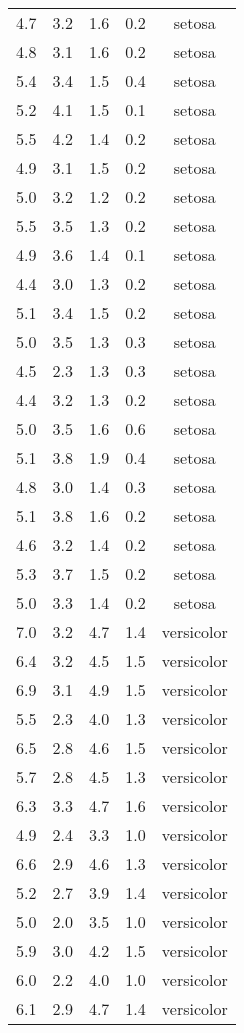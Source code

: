 \documentclass[
  letterpaper,
  DIV=11,
  numbers=noendperiod]{scrartcl}
\begin{document}
\begin{longtable}[]{@{}lrlrc@{}}
4.7 & 3.2 & 1.6 & 0.2 & setosa \\
4.8 & 3.1 & 1.6 & 0.2 & setosa \\
5.4 & 3.4 & 1.5 & 0.4 & setosa \\
5.2 & 4.1 & 1.5 & 0.1 & setosa \\
5.5 & 4.2 & 1.4 & 0.2 & setosa \\
4.9 & 3.1 & 1.5 & 0.2 & setosa \\
5.0 & 3.2 & 1.2 & 0.2 & setosa \\
5.5 & 3.5 & 1.3 & 0.2 & setosa \\
4.9 & 3.6 & 1.4 & 0.1 & setosa \\
4.4 & 3.0 & 1.3 & 0.2 & setosa \\
5.1 & 3.4 & 1.5 & 0.2 & setosa \\
5.0 & 3.5 & 1.3 & 0.3 & setosa \\
4.5 & 2.3 & 1.3 & 0.3 & setosa \\
4.4 & 3.2 & 1.3 & 0.2 & setosa \\
5.0 & 3.5 & 1.6 & 0.6 & setosa \\
5.1 & 3.8 & 1.9 & 0.4 & setosa \\
4.8 & 3.0 & 1.4 & 0.3 & setosa \\
5.1 & 3.8 & 1.6 & 0.2 & setosa \\
4.6 & 3.2 & 1.4 & 0.2 & setosa \\
5.3 & 3.7 & 1.5 & 0.2 & setosa \\
5.0 & 3.3 & 1.4 & 0.2 & setosa \\
7.0 & 3.2 & 4.7 & 1.4 & versicolor \\
6.4 & 3.2 & 4.5 & 1.5 & versicolor \\
6.9 & 3.1 & 4.9 & 1.5 & versicolor \\
5.5 & 2.3 & 4.0 & 1.3 & versicolor \\
6.5 & 2.8 & 4.6 & 1.5 & versicolor \\
5.7 & 2.8 & 4.5 & 1.3 & versicolor \\
6.3 & 3.3 & 4.7 & 1.6 & versicolor \\
4.9 & 2.4 & 3.3 & 1.0 & versicolor \\
6.6 & 2.9 & 4.6 & 1.3 & versicolor \\
5.2 & 2.7 & 3.9 & 1.4 & versicolor \\
5.0 & 2.0 & 3.5 & 1.0 & versicolor \\
5.9 & 3.0 & 4.2 & 1.5 & versicolor \\
6.0 & 2.2 & 4.0 & 1.0 & versicolor \\
6.1 & 2.9 & 4.7 & 1.4 & versicolor \\

\end{longtable}
\end{document}
